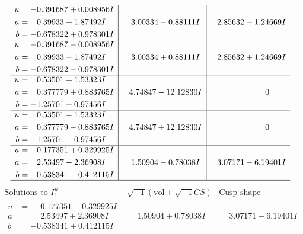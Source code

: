 \documentclass[1p]{elsarticle_modified}
\theoremstyle{definition}
\newcommand{\I}{\sqrt{-1}}
\begin{document}
$$\begin{array}{c|c|c}
\begin{aligned}
u &= -0.391687 + 0.008956 I \\
a &= \phantom{-}0.39933 + 1.87492 I \\
b &= -0.678322 + 0.978301 I\end{aligned}
 & \phantom{-}3.00334 - 0.88111 I & \phantom{-}2.85632 - 1.24669 I \\ \hline\begin{aligned}
u &= -0.391687 - 0.008956 I \\
a &= \phantom{-}0.39933 - 1.87492 I \\
b &= -0.678322 - 0.978301 I\end{aligned}
 & \phantom{-}3.00334 + 0.88111 I & \phantom{-}2.85632 + 1.24669 I \\ \hline\begin{aligned}
u &= \phantom{-}0.53501 + 1.53323 I \\
a &= \phantom{-}0.377779 + 0.883765 I \\
b &= -1.25701 + 0.97456 I\end{aligned}
 & \phantom{-}4.74847 - 12.12830 I & \phantom{-0.000000 } 0 \\ \hline\begin{aligned}
u &= \phantom{-}0.53501 - 1.53323 I \\
a &= \phantom{-}0.377779 - 0.883765 I \\
b &= -1.25701 - 0.97456 I\end{aligned}
 & \phantom{-}4.74847 + 12.12830 I & \phantom{-0.000000 } 0 \\ \hline\begin{aligned}
u &= \phantom{-}0.177351 + 0.329925 I \\
a &= \phantom{-}2.53497 - 2.36908 I \\
b &= -0.538341 - 0.412115 I\end{aligned}
 & \phantom{-}1.50904 - 0.78038 I & \phantom{-}3.07171 - 6.19401 I\\
 \hline 
 \end{array}$$\newpage$$\begin{array}{c|c|c}  
\text{Solutions to }I^u_{1}& \I (\text{vol} + \sqrt{-1}CS) & \text{Cusp shape}\\
 \hline 
\begin{aligned}
u &= \phantom{-}0.177351 - 0.329925 I \\
a &= \phantom{-}2.53497 + 2.36908 I \\
b &= -0.538341 + 0.412115 I\end{aligned}
 & \phantom{-}1.50904 + 0.78038 I & \phantom{-}3.07171 + 6.19401 I \\ \hline\begin{aligned}

\end{aligned}
\end{array}$$
\end{document}
